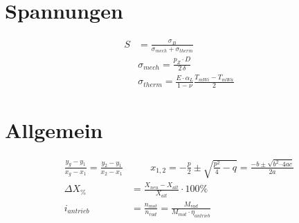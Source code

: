\documentclass[english,threecolumn,color]{latex4ei/latex4ei_sheet}
\begin{document}
\section{Spannungen}
\begin{sectionbox}
	\begin{align*}
	S&=\frac{\sigma_B}{\sigma_{mech}+\sigma_{therm}}\\
	&\sigma_{mech}=\frac{p_Z \cdot D}{2 \, \delta}\\
	&\sigma_{therm}=\frac{E \cdot \alpha_L}{1-\nu} \frac{T_{mWi}-T_{mWa}}{2}
	\end{align*}
\end{sectionbox}
\columnbreak

\section{Allgemein}
\begin{sectionbox}
	\begin{align*}
	\frac{y_g-y_1}{x_g-x_1}=\frac{ y_2-y_1}{x_2-x_1}& \qquad
	x_{1,2} = -\frac{p}{2}\pm  \sqrt{\frac{p^2}{4}-q}= \frac{- b \pm \sqrt{ b^{2} – 4ac } }{2a}\\
	\varDelta X_{\%} &= \frac{X_{neu}-X_{alt}}{X_{alt}}\cdot 100 \%\\
	i_{antrieb}&=\frac{n_{mot}}{n_{rad}}= \frac{M_{rad}}{M_{mot} \cdot \eta_{antrieb}}
	\end{align*}
\end{sectionbox}
\end{document}
